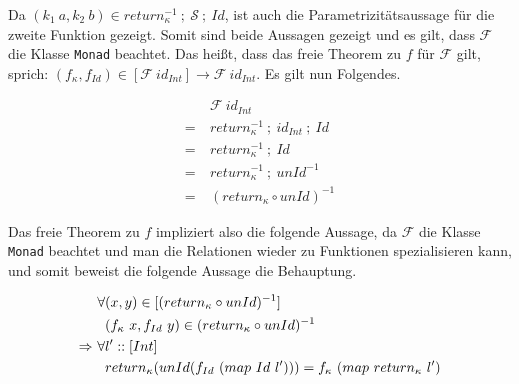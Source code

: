 Da $(k_1\ a, k_2\ b) \in return_{\kappa}^{-1}~;~\mathcal{S}~;~Id$, ist auch die Parametrizitätsaussage für die zweite Funktion
gezeigt. Somit sind beide Aussagen gezeigt und es gilt, dass $\mathcal{F}$ die Klasse \texttt{Monad} beachtet. Das heißt, dass
das freie Theorem zu $f$ für $\mathcal{F}$ gilt, sprich: $(f_{\kappa}, f_{Id}) \in [\mathcal{F}\ id_{Int}] \rightarrow \mathcal{F}\ 
id_{Int}$. Es gilt nun Folgendes.

\begin{align*}
& \mathcal{F}\ id_{Int} \\
=~& return_{\kappa}^{-1}~;~id_{Int}~;~Id \\
=~& return_{\kappa}^{-1}~;~Id \\
=~& return_{\kappa}^{-1}~;~unId^{-1} \\
=~& (return_{\kappa} \circ unId)^{-1}
\end{align*}

Das freie Theorem zu $f$ impliziert also die folgende Aussage, da $\mathcal{F}$ die Klasse \texttt{Monad} beachtet und man
die Relationen wieder zu Funktionen spezialisieren kann, und somit beweist die folgende Aussage die Behauptung.

\begin{align*}
& \forall (x, y) \in [(return_{\kappa} \circ unId)^{-1}] \\
& \hphantom{\forall} (f_{\kappa}\ x, f_{Id}\ y) \in (return_{\kappa} \circ unId)^{-1} \\
\Rightarrow~& \forall l' :: [Int] \\
& \hphantom{\forall} return_{\kappa} (unId (f_{Id}\ (map\ Id\ l'))) = f_{\kappa}\ (map\ return_{\kappa}\ l')
\end{align*}


